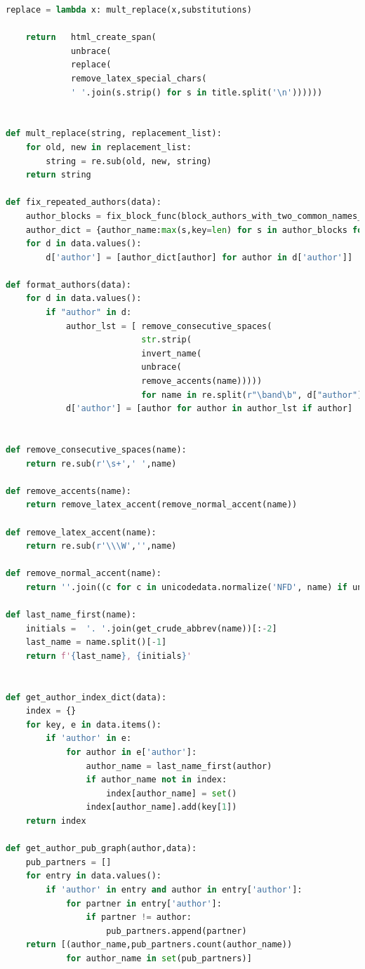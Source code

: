 \documentclass[11pt,a4paper]{report}
\begin{document}
\begin{appendices}
\begin{lstlisting}[language=python]
    replace = lambda x: mult_replace(x,substitutions)

    return   html_create_span(
             unbrace(
             replace(
             remove_latex_special_chars(
             ' '.join(s.strip() for s in title.split('\n'))))))


def mult_replace(string, replacement_list):
    for old, new in replacement_list:
        string = re.sub(old, new, string)
    return string

def fix_repeated_authors(data):
    author_blocks = fix_block_func(block_authors_with_two_common_names_v2(get_author_list(data)))
    author_dict = {author_name:max(s,key=len) for s in author_blocks for author_name in s}
    for d in data.values():
        d['author'] = [author_dict[author] for author in d['author']]

def format_authors(data):
    for d in data.values():
        if "author" in d:
            author_lst = [ remove_consecutive_spaces(
                           str.strip(
                           invert_name(
                           unbrace(
                           remove_accents(name)))))
                           for name in re.split(r"\band\b", d["author"].replace("\n", " "))]
            d['author'] = [author for author in author_lst if author]


def remove_consecutive_spaces(name):
    return re.sub(r'\s+',' ',name)

def remove_accents(name):
    return remove_latex_accent(remove_normal_accent(name))

def remove_latex_accent(name):
    return re.sub(r'\\\W','',name)

def remove_normal_accent(name):
    return ''.join((c for c in unicodedata.normalize('NFD', name) if unicodedata.category(c) != 'Mn'))

def last_name_first(name):
    initials =  '. '.join(get_crude_abbrev(name))[:-2]
    last_name = name.split()[-1]
    return f'{last_name}, {initials}'


def get_author_index_dict(data):
    index = {}
    for key, e in data.items():
        if 'author' in e:
            for author in e['author']:
                author_name = last_name_first(author)
                if author_name not in index:
                    index[author_name] = set()
                index[author_name].add(key[1])
    return index

def get_author_pub_graph(author,data):
    pub_partners = []
    for entry in data.values():
        if 'author' in entry and author in entry['author']:
            for partner in entry['author']:
                if partner != author:
                    pub_partners.append(partner)
    return [(author_name,pub_partners.count(author_name))
            for author_name in set(pub_partners)]


\end{lstlisting}
\end{appendices}
\end{document}
